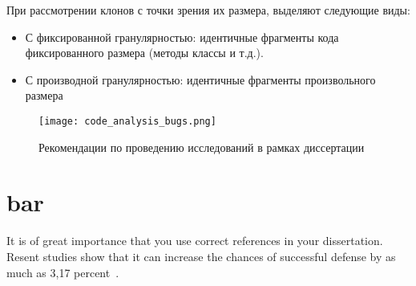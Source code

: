 При рассмотрении клонов с точки зрения их размера, выделяют следующие виды:
\begin{itemize}
\item С фиксированной гранулярностью: идентичные фрагменты кода фиксированного размера (методы классы и т.д.).
\item С производной гранулярностью: идентичные фрагменты произвольного размера
\end{itemize}




\begin{figure}[htbp]
\centering
\texttt{[image: code\_analysis\_bugs.png]}
\caption{Рекомендации по проведению исследований в рамках диссертации}%
\label{fig:how-to-do-research}
\end{figure}

\Blindtext

\section{bar}

\blindtext
It is of great importance that you use correct references in your dissertation.
Resent studies show that it can increase the chances of successful defense
by as much as 3,17 percent~\cite{russian, java-book, ANTLR}.

\Blindtext
